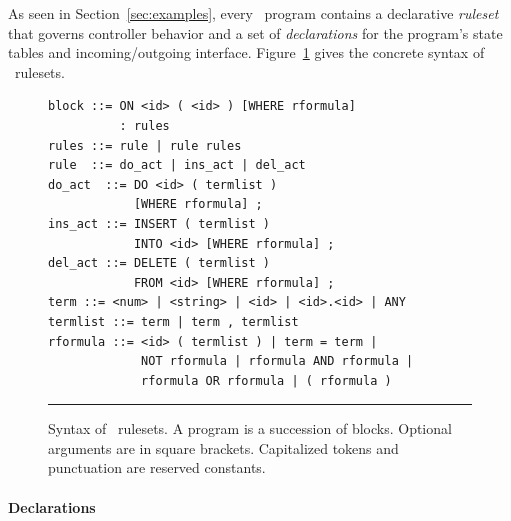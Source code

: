 As seen in Section~\ref{sec:examples}, every \flowlog\ program contains a
declarative \emph{ruleset} that governs controller behavior and a set of
\emph{declarations} for the program's state tables and incoming/outgoing interface.
Figure~\ref{fig:syntax} gives the concrete syntax of \flowlog\ rulesets.





\begin{figure}[t]
\footnotesize
\begin{verbatim}
block ::= ON <id> ( <id> ) [WHERE rformula] 
          : rules
rules ::= rule | rule rules
rule  ::= do_act | ins_act | del_act
do_act  ::= DO <id> ( termlist )
            [WHERE rformula] ;
ins_act ::= INSERT ( termlist ) 
            INTO <id> [WHERE rformula] ;
del_act ::= DELETE ( termlist )
            FROM <id> [WHERE rformula] ;
term ::= <num> | <string> | <id> | <id>.<id> | ANY
termlist ::= term | term , termlist
rformula ::= <id> ( termlist ) | term = term | 
             NOT rformula | rformula AND rformula | 
             rformula OR rformula | ( rformula )   
\end{verbatim}
\normalsize
\caption{\small Syntax of \flowlog\ rulesets. A program is a succession of  blocks. Optional arguments are in square brackets. Capitalized tokens and punctuation are reserved constants.}
\label{fig:syntax}
\hrule
\end{figure}

\paragraph{Declarations}

